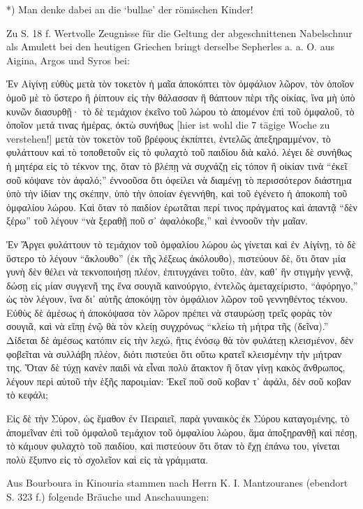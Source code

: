 \documentclass[a4paper, 11pt, oneside]{article}
\begin{document}
*) Man denke dabei an die `bullae' der römischen Kinder!

Zu S. 18 f. Wertvolle Zeugnisse für die Geltung der abgeschnittenen Nabelschnur als Amulett bei den heutigen Griechen bringt derselbe Sepherles a. a. O. aus Aigina, Argos und Syros bei:

Ἐν Αἰγίνῃ εὐθὺς μετὰ τὸν τοκετὸν ἡ μαῖα ἁποκόπτει τὸν ὀμφάλιον λῶρον, τὸν ὁποῖον ὁμοῦ μὲ τὸ ὕστερο ἢ ῥίπτουν εἰς τὴν θάλασσαν ἢ θάπτουν πὲρι τῆς οἰκίας, ἵνα μὴ ὑπὸ κυνῶν διασυρθῇ· τὸ δὲ τεµάχιον ἐκεῖνο τοῦ λώρου τὸ ἀπομένον ἐπὶ τοῦ ὀμφαλοῦ, τὸ ὁποῖον µετά τινας ἡμέρας, ὀκτὼ συνήθως [hier ist wohl die 7 tägige Woche zu verstehen!] μετὰ τὸν τοκετὸν τοῦ βρέφους ἐκπίπτει, ἐντελῶς ἀπεξηραμμένον, τὸ φυλάττουν καὶ τὸ τοποθετοῦν εἰς τὸ φυλαχτὸ τοῦ παιδίου διὰ καλό. λέγει δὲ συνήθως ἡ μητέρα εἰς τὸ τέκνον της, ὅταν τὸ βλέπῃ νὰ συχνάζῃ εἰς τόπον ἢ οἰκίαν τινὰ "`ἐκεῖ σοῦ κόψανε τὸν ἀφαλό;"' ἐννοοῦσα ὅτι ὀφείλει νὰ διαμένῃ τὸ περισσότερον διάστηµα ὑπὸ τὴν ἰδίαν της σκέπην, ὑπὸ τὴν ὁποίαν ἐγεννήθη, καὶ τοῦ ἐγένετο ἡ ἀποκοπὴ τοῦ ὀμφαλίου λώρου. Καὶ ὅταν τὸ παιδίον ἐρωτᾶται περί τινος πράγματος καὶ ἀπαντᾷ "`δὲν ξέρω"' τοῦ λέγουν "`νὰ ξεραθῇ ποῦ σ᾿ ἀφαλόκοβε,"' καὶ ἐννοοῦν τὴν μαῖαν.

Ἐν Ἄργει φυλάττουν τὸ τεµάχιον τοῦ ὀμφαλίου λώρου ὡς γίνεται καὶ ἐν Αἰγίνῃ, τὸ δὲ ὕστερο τὸ λέγουν "`ἄκλουθο"' (ἐκ τῆς λέξεως ἀκόλουθο), πιστεύουν δὲ, ὅτι ὅταν µία γυνὴ δὲν θέλει νὰ τεκνοποιήσῃ πλέον, ἐπιτυγχάνει τοῦτο, ἐὰν, καθ᾽ ἣν στιγμὴν γεννᾷ, δώσῃ εἰς µίαν συγγενῆ της ἕνα σουγιᾶ καινούργιο, ἐντελῶς ἁμεταχείριστο, "`ἀφόρηγο,"' ὡς τὸν λέγουν, ἵνα δι᾿ αὐτῆς ἀποκόψῃ τὸν ὀμφάλιον λῶρον τοῦ γεννηθέντος τέκνου. Εὐθὺς δὲ ἀμέσως ἡ ἀποκόψασα τὸν λῶρον πρέπει νὰ σταυρώσῃ τρεῖς φορὰς τὸν σουγιᾶ, καὶ νὰ εἴπῃ ἑνῷ θὰ τὸν κλείῃ συγχρόνως "`κλείω τὴ µήτρα τῆς (δεῖνα)."' Δίδεται δὲ ἀμέσως κατόπιν εἰς τὴν λεχώ, ἥτις ἐνόσῳ θὰ τὸν φυλάτεῃ κλεισµένον, δὲν φοβεῖται νὰ συλλάβη πλέον, διότι πιστεύει ὅτι οὕτω κρατεῖ κλεισμένην τὴν µήτραν της. Ὅταν δὲ τύχῃ κανὲν παιδὶ νὰ εἶναι πολὺ ἄτακτον ἢ ὅταν γίνῃ κακὸς ἄνθρωπος, λέγουν περὶ αὐτοῦ τὴν ἑξῆς παροιµίαν: Ἐκεῖ ποῦ σοῦ κοβαν τ᾽ ἀφάλι, δὲν σοῦ κοβαν τὸ κεφάλι;

Εἰς δὲ τὴν Σύρον, ὡς ἔμαθον ἐν Πειραιεῖ, παρὰ γυναικὸς ἐκ Σύρου καταγοµένης, τὸ ἀπομεῖναν ἐπὶ τοῦ ὀμφαλοῦ τεµάχιον τοῦ ὀμφαλίου λώρου, ἅμα ἀποξηρανθῇ καὶ πἐσῃ, τὸ κάµουν φυλαχτὸ τοῦ παιδίου, καὶ πιστεύουν ὅτι ὅταν τὸ ἔχῃ ἐπάνω του, γίνεται πολὺ ἔξυπνο εἰς τὸ σχολεῖον καὶ εἰς τὰ γράµµατα.


Aus Bourboura in Kinouria stammen nach Herrn K. I. Mantzouranes (ebendort S. 323 f.) folgende Bräuche und Anschauungen:
\end{document}

